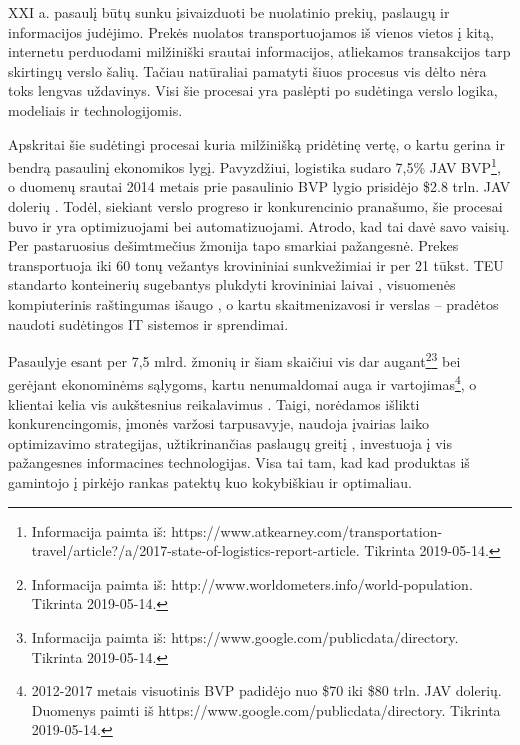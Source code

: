 
XXI a. pasaulį būtų sunku įsivaizduoti be nuolatinio prekių, paslaugų ir informacijos judėjimo. Prekės nuolatos transportuojamos iš vienos vietos į kitą, internetu perduodami milžiniški srautai informacijos, atliekamos transakcijos tarp skirtingų verslo šalių. Tačiau natūraliai pamatyti šiuos procesus vis dėlto nėra toks lengvas uždavinys. Visi šie procesai yra paslėpti po sudėtinga verslo logika, modeliais ir technologijomis. 

Apskritai šie sudėtingi procesai kuria milžinišką pridėtinę vertę, o kartu gerina ir bendrą pasaulinį ekonomikos lygį. Pavyzdžiui, logistika sudaro 7,5\% JAV BVP\footnote{Informacija paimta iš: https://www.atkearney.com/transportation-travel/article?/a/2017-state-of-logistics-report-article. Tikrinta 2019-05-14.}, o duomenų srautai 2014 metais prie pasaulinio BVP lygio prisidėjo \$2.8 trln. JAV dolerių \cite{manyika2016digital}. Todėl, siekiant verslo progreso ir konkurencinio pranašumo, šie procesai buvo ir yra optimizuojami bei automatizuojami. Atrodo, kad tai davė savo vaisių. Per pastaruosius dešimtmečius žmonija tapo smarkiai pažangesnė. Prekes transportuoja iki 60 tonų vežantys krovininiai sunkvežimiai \cite{lumsden2004truck} ir per 21 tūkst. TEU standarto konteinerių sugebantys plukdyti krovininiai laivai \cite{halff2019likely}, visuomenės kompiuterinis raštingumas išaugo \cite{van2015internet}, o kartu skaitmenizavosi ir verslas – pradėtos naudoti sudėtingos IT sistemos ir sprendimai.

Pasaulyje esant per 7,5 mlrd. žmonių ir šiam skaičiui vis dar augant\footnote{Informacija paimta iš: http://www.worldometers.info/world-population. Tikrinta 2019-05-14.}\footnote{\label{note1}Informacija paimta iš: https://www.google.com/publicdata/directory. Tikrinta 2019-05-14.} bei gerėjant ekonominėms sąlygoms, kartu nenumaldomai auga ir vartojimas\footnote{2012-2017 metais visuotinis BVP padidėjo nuo \$70 iki \$80 trln. JAV dolerių. Duomenys paimti iš https://www.google.com/publicdata/directory. Tikrinta 2019-05-14.}, o klientai kelia vis aukštesnius reikalavimus \cite{nilsson2006logistics}. Taigi, norėdamos išlikti konkurencingomis, įmonės varžosi tarpusavyje, naudoja įvairias laiko optimizavimo strategijas, užtikrinančias paslaugų greitį \cite{zacharia2004logistics}, investuoja į vis pažangesnes informacines technologijas. Visa tai tam, kad kad produktas iš gamintojo į pirkėjo rankas patektų kuo kokybiškiau ir optimaliau.

